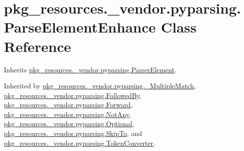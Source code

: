 \hypertarget{classpkg__resources_1_1__vendor_1_1pyparsing_1_1_parse_element_enhance}{}\section{pkg\+\_\+resources.\+\_\+vendor.\+pyparsing.\+Parse\+Element\+Enhance Class Reference}
\label{classpkg__resources_1_1__vendor_1_1pyparsing_1_1_parse_element_enhance}


Inherits \hyperlink{classpkg__resources_1_1__vendor_1_1pyparsing_1_1_parser_element}{pkg\+\_\+resources.\+\_\+vendor.\+pyparsing.\+Parser\+Element}.



Inherited by \hyperlink{classpkg__resources_1_1__vendor_1_1pyparsing_1_1___multiple_match}{pkg\+\_\+resources.\+\_\+vendor.\+pyparsing.\+\_\+\+Multiple\+Match}, \hyperlink{classpkg__resources_1_1__vendor_1_1pyparsing_1_1_followed_by}{pkg\+\_\+resources.\+\_\+vendor.\+pyparsing.\+Followed\+By}, \hyperlink{classpkg__resources_1_1__vendor_1_1pyparsing_1_1_forward}{pkg\+\_\+resources.\+\_\+vendor.\+pyparsing.\+Forward}, \hyperlink{classpkg__resources_1_1__vendor_1_1pyparsing_1_1_not_any}{pkg\+\_\+resources.\+\_\+vendor.\+pyparsing.\+Not\+Any}, \hyperlink{classpkg__resources_1_1__vendor_1_1pyparsing_1_1_optional}{pkg\+\_\+resources.\+\_\+vendor.\+pyparsing.\+Optional}, \hyperlink{classpkg__resources_1_1__vendor_1_1pyparsing_1_1_skip_to}{pkg\+\_\+resources.\+\_\+vendor.\+pyparsing.\+Skip\+To}, and \hyperlink{classpkg__resources_1_1__vendor_1_1pyparsing_1_1_token_converter}{pkg\+\_\+resources.\+\_\+vendor.\+pyparsing.\+Token\+Converter}.

